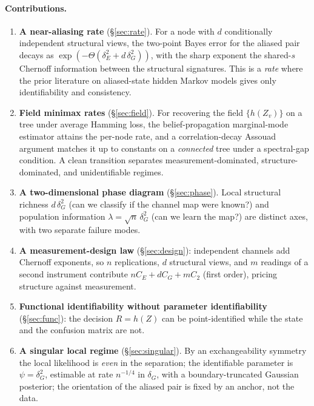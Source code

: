 \documentclass[11pt]{article}
\theoremstyle{plain}
\theoremstyle{definition}\newtheorem{definition}{Definition}\newtheorem{assumption}{Assumption}
\begin{document}
\paragraph{Contributions.}
\begin{enumerate}[leftmargin=*,itemsep=1pt,topsep=2pt]
\item \textbf{A near-aliasing rate} (\S\ref{sec:rate}). For a node with $d$ conditionally independent structural
views, the two-point Bayes error for the aliased pair decays as $\exp(-\Theta(\delta_E^2+d\,\delta_G^2))$, with the
sharp exponent the shared-$s$ Chernoff information between the structural signatures. This is a \emph{rate} where
the prior literature on aliased-state hidden Markov models gives only identifiability and consistency.
\item \textbf{Field minimax rates} (\S\ref{sec:field}). For recovering the field $\{h(Z_v)\}$ on a tree under
average Hamming loss, the belief-propagation marginal-mode estimator attains the per-node rate, and a
correlation-decay Assouad argument matches it up to constants on a \emph{connected} tree under a spectral-gap
condition. A clean transition separates measurement-dominated, structure-dominated, and unidentifiable regimes.
\item \textbf{A two-dimensional phase diagram} (\S\ref{sec:phase}). Local structural richness $d\,\delta_G^2$
(can we classify if the channel map were known?) and population information $\lambda=\sqrt n\,\delta_G^2$ (can we
learn the map?) are distinct axes, with two separate failure modes.
\item \textbf{A measurement-design law} (\S\ref{sec:design}): independent channels add Chernoff exponents, so
$n$ replications, $d$ structural views, and $m$ readings of a second instrument contribute
$nC_E+dC_G+mC_2$ (first order), pricing structure against measurement.
\item \textbf{Functional identifiability without parameter identifiability} (\S\ref{sec:func}): the decision
$R=h(Z)$ can be point-identified while the state and the confusion matrix are not.
\item \textbf{A singular local regime} (\S\ref{sec:singular}). By an exchangeability symmetry the local likelihood
is \emph{even} in the separation; the identifiable parameter is $\psi=\delta_G^2$, estimable at rate $n^{-1/4}$ in
$\delta_G$, with a boundary-truncated Gaussian posterior; the orientation of the aliased pair is fixed by an
anchor, not the data.
\end{enumerate}
\end{document}
